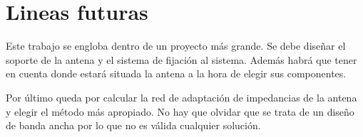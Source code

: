 \documentclass[12pt]{article}
\begin{document}
\newpage
\section{Lineas futuras}

Este trabajo se engloba dentro de un proyecto más grande. Se debe diseñar el soporte de la antena y el sistema de fijación al sistema. Además habrá que tener en cuenta donde estará situada la antena a la hora de elegir sus componentes.

Por último queda por calcular la red de adaptación de impedancias de la antena y elegir el método más apropiado. No hay que olvidar que se trata de un diseño de banda ancha por lo que no es válida cualquier solución.
\end{document}
